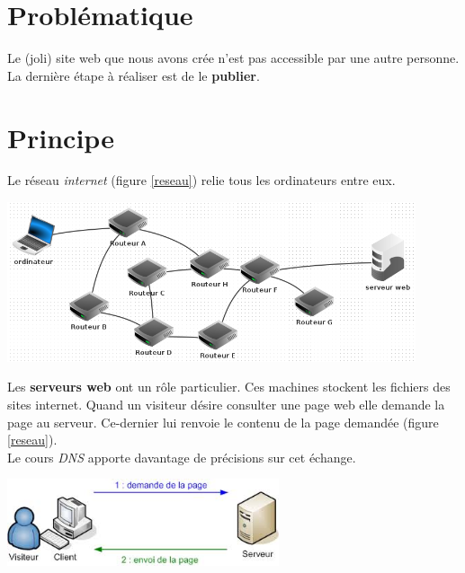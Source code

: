 \documentclass[a4paper,11pt]{article}
\begin{document}
\begin{Form}
\section{Problématique}
Le (joli) site web que nous avons crée n'est pas accessible par une autre personne. La dernière étape à réaliser est de le \textbf{publier}.
\begin{center}
\end{center}
\section{Principe}
Le réseau \emph{internet} (figure \ref{reseau}) relie tous les ordinateurs entre eux.
\begin{center}
\centering
\includegraphics[width=12cm]{ressources/serveur-web.png}
\label{reseau}
\end{center}
Les \textbf{serveurs web} ont un rôle particulier. Ces machines stockent les fichiers des sites internet. Quand un visiteur désire consulter une page web elle demande la page au serveur. Ce-dernier lui renvoie le contenu de la page demandée (figure \ref{reseau}).\\
Le cours \emph{DNS} apporte davantage de précisions sur cet échange.
\begin{center}
\centering
\includegraphics[width=8cm]{ressources/http.jpeg}
\label{consult}
\end{center}


\end{Form}
\end{document}
